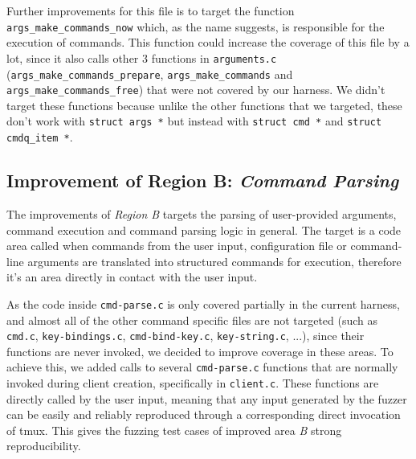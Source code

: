 \documentclass[11pt,a4paper,twocolumn]{article}
\begin{document}
Further improvements for this file is to target the function \texttt{args\_make\_commands\_now} which, as the name suggests, is responsible for the execution of commands. This function could increase the coverage of this file by a lot, since it also calls other 3 functions in \texttt{arguments.c} (\texttt{args\_make\_commands\_prepare}, \texttt{args\_make\_commands} and \texttt{args\_make\_commands\_free}) that were not covered by our harness. We didn't target these functions because unlike the other functions that we targeted, these don't work with \texttt{struct args *} but instead with \texttt{struct cmd *} and \texttt{struct cmdq\_item *}.


\subsection*{Improvement of Region B: \textit{Command Parsing}}

The improvements of \textit{Region B} targets the parsing of user-provided arguments, command execution and command parsing logic in general. The target is a code area called when commands from the user input, configuration file  or command-line arguments are translated into structured commands for execution, therefore it's an area directly in contact with the user input. 

As the code inside \texttt{cmd-parse.c} is only covered partially in the current harness, and almost all of the other command specific files are not targeted (such as \texttt{cmd.c}, \texttt{key-bindings.c}, \texttt{cmd-bind-key.c}, \texttt{key-string.c}, ...), since their functions are never invoked, we decided to improve coverage in these areas. To achieve this, we added calls to several \texttt{cmd-parse.c} functions that are normally invoked during client creation, specifically in \texttt{client.c}. These functions are directly called by the user input, meaning that any input generated by the fuzzer can be  easily and reliably reproduced through a corresponding direct invocation of tmux. This gives the fuzzing test cases of improved area \textit{B} strong reproducibility.
\end{document}
